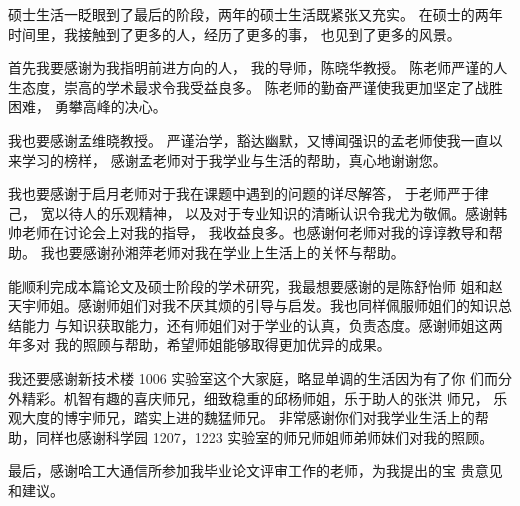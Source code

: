 

硕士生活一眨眼到了最后的阶段，两年的硕士生活既紧张又充实。
在硕士的两年时间里，我接触到了更多的人，经历了更多的事，
也见到了更多的风景。

首先我要感谢为我指明前进方向的人，
我的导师，陈晓华教授。
陈老师严谨的人生态度，崇高的学术最求令我受益良多。
陈老师的勤奋严谨使我更加坚定了战胜困难，
勇攀高峰的决心。

我也要感谢孟维晓教授。
严谨治学，豁达幽默，又博闻强识的孟老师使我一直以来学习的榜样，
感谢孟老师对于我学业与生活的帮助，真心地谢谢您。

我也要感谢于启月老师对于我在课题中遇到的问题的详尽解答，
于老师严于律己，
宽以待人的乐观精神，
以及对于专业知识的清晰认识令我尤为敬佩。感谢韩帅老师在讨论会上对我的指导，
我收益良多。也感谢何老师对我的谆谆教导和帮助。
我也要感谢孙湘萍老师对我在学业上生活上的关怀与帮助。

能顺利完成本篇论文及硕士阶段的学术研究，我最想要感谢的是陈舒怡师
姐和赵天宇师姐。感谢师姐们对我不厌其烦的引导与启发。我也同样佩服师姐们的知识总结能力
与知识获取能力，还有师姐们对于学业的认真，负责态度。感谢师姐这两年多对
我的照顾与帮助，希望师姐能够取得更加优异的成果。

我还要感谢新技术楼 1006 实验室这个大家庭，略显单调的生活因为有了你
们而分外精彩。机智有趣的喜庆师兄，细致稳重的邱杨师姐，乐于助人的张洪
师兄，
乐观大度的博宇师兄，踏实上进的魏猛师兄。
非常感谢你们对我学业生活上的帮助，同样也感谢科学园 1207，1223
实验室的师兄师姐师弟师妹们对我的照顾。

最后，感谢哈工大通信所参加我毕业论文评审工作的老师，为我提出的宝
贵意见和建议。
